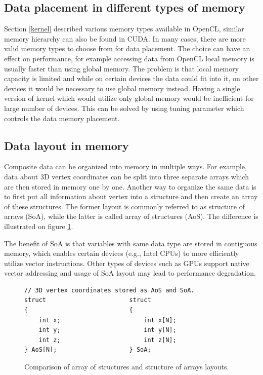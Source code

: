 \documentclass
[
    digital, %
    oneside, %
    table, %
    nolof, %
    nolot, %
    nocover %
]{fithesis3}
\begin{document}
\subsection{Data placement in different types of memory}
Section \ref{kernel} described various memory types available in OpenCL, similar memory hierarchy can also be found in CUDA. In many cases, there are
more valid memory types to choose from for data placement. The choice can have an effect on performance, for example accessing data from OpenCL local
memory is usually faster than using global memory. The problem is that local memory capacity is limited and while on certain devices the data could
fit into it, on other devices it would be necessary to use global memory instead. Having a single version of kernel which would utilize only global
memory would be inefficient for large number of devices. This can be solved by using tuning parameter which controls the data memory placement.

\subsection{Data layout in memory}
Composite data can be organized into memory in multiple ways. For example, data about 3D vertex coordinates can be split into three separate arrays
which are then stored in memory one by one. Another way to organize the same data is to first put all information about vertex into a structure and
then create an array of these structures. The former layout is commonly referred to as structure of arrays (SoA), while the latter is called array
of structures (AoS). The difference is illustrated on figure \ref{aos_soa}.

The benefit of SoA is that variables with same data type are stored in contiguous memory, which enables certain devices (e.g., Intel CPUs) to more
efficiently utilize vector instructions. Other types of devices such as GPUs support native vector addressing and usage of SoA layout may lead to
performance degradation.

\begin{figure}
\begin{lstlisting}
// 3D vertex coordinates stored as AoS and SoA.
struct                       struct
{                            {
    int x;                       int x[N];
    int y;                       int y[N];
    int z;                       int z[N];
} AoS[N];                    } SoA;
\end{lstlisting}
\caption{Comparison of array of structures and structure of arrays layouts.}
\label{aos_soa}
\end{figure}
\end{document}
